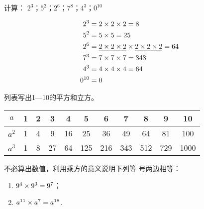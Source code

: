 \begin{example}
    计算：
$2^3$；$5^2$；$2^6$；$7^8$；$4^3 $；$0^{10}$
\end{example}

\begin{solution}
    \[\begin{split}
        2^3&=2\times2\times2=8\\
        5^2&=5\times5=25\\
        2^6&=\underline{2\times2\times2}\times\underline{2\times2\times2}=64\\
        7^3&=7\times7\times7=343\\
        4^3&=4\times4\times4=64\\
        0^{10}&=0
    \end{split}\]
\end{solution}

\begin{example}
    列表写出1—10的平方和立方。
\end{example}

\begin{solution}
    \begin{center}
        \begin{tabular}{c|cccccccccc}
            \hline
$a$ & 1&2&3&4&5&6&7&8&9&10\\
            \hline
$a^2$&1&4&9&16&25&36&49&64&81&100\\
$a^3$&1&8&27&64&125&216&343&512&729&1000\\
            \hline
        \end{tabular}
    \end{center}
\end{solution}

\begin{example}
不必算出数值，利用乘方的意义说明下列等
号两边相等：
\begin{enumerate}
    \item $9^4\times9^3=9^7$；
    \item $a^{11}\times a^7=a^{18}$.
\end{enumerate}
\end{example}

